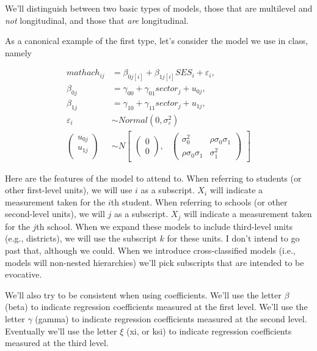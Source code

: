 \documentclass[
  letterpaper,
  DIV=11,
  numbers=noendperiod]{scrreprt}
\begin{document}
We'll distinguish between two basic types of models, those that are
multilevel and \emph{not} longitudinal, and those that \emph{are}
longitudinal.

As a canonical example of the first type, let's consider the model we
use in class, namely

\[\begin{aligned}
mathach_{ij} &= \beta_{0j[i]} + \beta_{1j[i]}SES_i + \varepsilon_i, \\
\beta_{0j} &= \gamma_{00} + \gamma_{01}sector_j + u_{0j},\\
\beta_{1j} &= \gamma_{10} + \gamma_{11}sector_j + u_{1j},\\
\varepsilon_i &\sim Normal(0, \sigma^2_\varepsilon) \\
\begin{pmatrix}
u_{0j}\\
u_{1j}\\
\end{pmatrix} &\sim  N
\begin{bmatrix}
\begin{pmatrix}
0\\
0
\end{pmatrix}\!\!,&
\begin{pmatrix}
\sigma^2_0 & \rho\sigma_0\sigma_1\\
\rho\sigma_0\sigma_1 & \sigma^2_1
\end{pmatrix}
\end{bmatrix}
\end{aligned}\]

Here are the features of the model to attend to. When referring to
students (or other first-level units), we will use \(i\) as a subscript.
\(X_i\) will indicate a measurement taken for the \(i\)th student. When
referring to schools (or other second-level units), we will \(j\) as a
subscript. \(X_j\) will indicate a measurement taken for the \(j\)th
school. When we expand these models to include third-level units (e.g.,
districts), we will use the subscript \(k\) for these units. I don't
intend to go past that, although we could. When we introduce
cross-classified models (i.e., models will non-nested hierarchies) we'll
pick subscripts that are intended to be evocative.

We'll also try to be consistent when using coefficients. We'll use the
letter \(\beta\) (beta) to indicate regression coefficients measured at
the first level. We'll use the letter \(\gamma\) (gamma) to indicate
regression coefficients measured at the second level. Eventually we'll
use the letter \(\xi\) (xi, or ksi) to indicate regression coefficients
measured at the third level.
\end{document}
